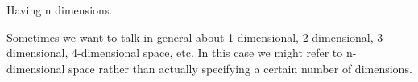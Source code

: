 Having n dimensions.
\par
Sometimes we want to talk in general about 1-dimensional,
2-dimensional, 3-dimensional, 4-dimensional space, etc. In 
this case we might refer to n-dimensional space rather than
actually specifying a certain number of dimensions.